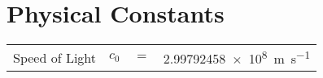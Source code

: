 %
%

\chapter*{Physical Constants}



\begin{table}[ht]
	\begin{tabular}{l l l l}
		Speed of Light & $c_{0}$ & $=$ & \SI{2.99792458e8}{\meter\per\second}\\
	\end{tabular}
\end{table}
\cleardoublepage %